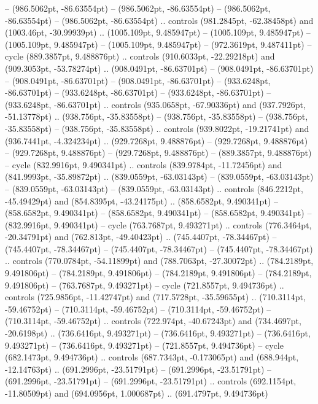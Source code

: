  -- (986.5062pt, -86.63554pt)
 -- (986.5062pt, -86.63554pt)
 -- (986.5062pt, -86.63554pt)
 -- (986.5062pt, -86.63554pt) .. controls (981.2845pt, -62.38458pt) and (1003.46pt, -30.99939pt) .. (1005.109pt, 9.485947pt)
 -- (1005.109pt, 9.485947pt)
 -- (1005.109pt, 9.485947pt)
 -- (1005.109pt, 9.485947pt)
 -- (972.3619pt, 9.487411pt) -- cycle
(889.3857pt, 9.488876pt) .. controls (910.6033pt, -22.29218pt) and (909.3053pt, -53.78274pt) .. (908.0491pt, -86.63701pt)
 -- (908.0491pt, -86.63701pt)
 -- (908.0491pt, -86.63701pt)
 -- (908.0491pt, -86.63701pt)
 -- (933.6248pt, -86.63701pt)
 -- (933.6248pt, -86.63701pt)
 -- (933.6248pt, -86.63701pt)
 -- (933.6248pt, -86.63701pt) .. controls (935.0658pt, -67.90336pt) and (937.7926pt, -51.13778pt) .. (938.756pt, -35.83558pt)
 -- (938.756pt, -35.83558pt)
 -- (938.756pt, -35.83558pt)
 -- (938.756pt, -35.83558pt) .. controls (939.8022pt, -19.21741pt) and (936.7441pt, -4.324234pt) .. (929.7268pt, 9.488876pt)
 -- (929.7268pt, 9.488876pt)
 -- (929.7268pt, 9.488876pt)
 -- (929.7268pt, 9.488876pt)
 -- (889.3857pt, 9.488876pt) -- cycle
(832.9916pt, 9.490341pt) .. controls (839.9784pt, -11.72456pt) and (841.9993pt, -35.89872pt) .. (839.0559pt, -63.03143pt)
 -- (839.0559pt, -63.03143pt)
 -- (839.0559pt, -63.03143pt)
 -- (839.0559pt, -63.03143pt) .. controls (846.2212pt, -45.49429pt) and (854.8395pt, -43.24175pt) .. (858.6582pt, 9.490341pt)
 -- (858.6582pt, 9.490341pt)
 -- (858.6582pt, 9.490341pt)
 -- (858.6582pt, 9.490341pt)
 -- (832.9916pt, 9.490341pt) -- cycle
(763.7687pt, 9.493271pt) .. controls (776.3464pt, -20.34791pt) and (762.813pt, -49.40423pt) .. (745.4407pt, -78.34467pt)
 -- (745.4407pt, -78.34467pt)
 -- (745.4407pt, -78.34467pt)
 -- (745.4407pt, -78.34467pt) .. controls (770.0784pt, -54.11899pt) and (788.7063pt, -27.30072pt) .. (784.2189pt, 9.491806pt)
 -- (784.2189pt, 9.491806pt)
 -- (784.2189pt, 9.491806pt)
 -- (784.2189pt, 9.491806pt)
 -- (763.7687pt, 9.493271pt) -- cycle
(721.8557pt, 9.494736pt) .. controls (725.9856pt, -11.42747pt) and (717.5728pt, -35.59655pt) .. (710.3114pt, -59.46752pt)
 -- (710.3114pt, -59.46752pt)
 -- (710.3114pt, -59.46752pt)
 -- (710.3114pt, -59.46752pt) .. controls (722.974pt, -40.67243pt) and (734.4697pt, -20.6198pt) .. (736.6416pt, 9.493271pt)
 -- (736.6416pt, 9.493271pt)
 -- (736.6416pt, 9.493271pt)
 -- (736.6416pt, 9.493271pt)
 -- (721.8557pt, 9.494736pt) -- cycle
(682.1473pt, 9.494736pt) .. controls (687.7343pt, -0.173065pt) and (688.944pt, -12.14763pt) .. (691.2996pt, -23.51791pt)
 -- (691.2996pt, -23.51791pt)
 -- (691.2996pt, -23.51791pt)
 -- (691.2996pt, -23.51791pt) .. controls (692.1154pt, -11.80509pt) and (694.0956pt, 1.000687pt) .. (691.4797pt, 9.494736pt)

